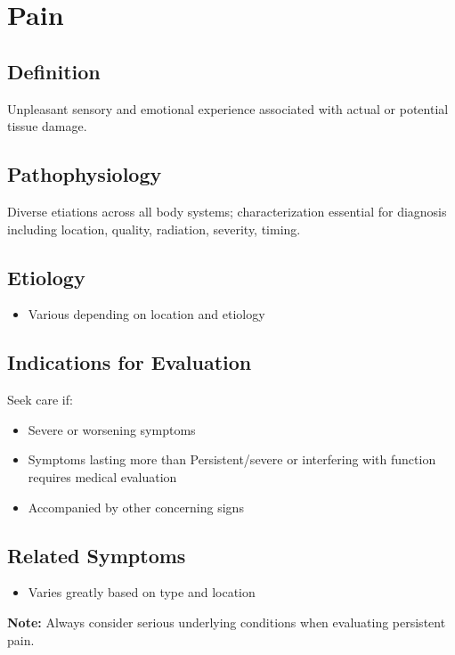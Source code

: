 \chapter{Pain}

\section*{Definition}
Unpleasant sensory and emotional experience associated with actual or potential tissue damage.

\section*{Pathophysiology}
Diverse etiations across all body systems; characterization essential for diagnosis including location, quality, radiation, severity, timing.

\section*{Etiology}
\begin{itemize}
  \item Various depending on location and etiology
\end{itemize}

\section*{Indications for Evaluation}
Seek care if:
\begin{itemize}
  \item Severe or worsening symptoms
  \item Symptoms lasting more than Persistent/severe or interfering with function requires medical evaluation
  \item Accompanied by other concerning signs
\end{itemize}

\section*{Related Symptoms}
\begin{itemize}
  \item Varies greatly based on type and location
\end{itemize}
\textbf{Note:} Always consider serious underlying conditions when evaluating persistent pain.

